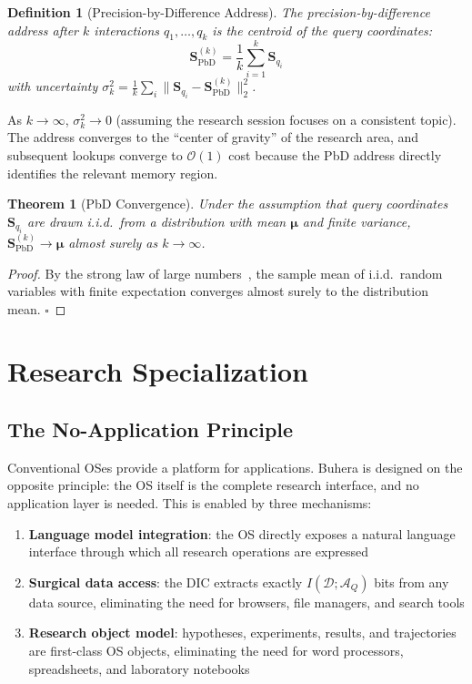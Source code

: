 \documentclass[12pt,twocolumn]{article}
\newtheorem{theorem}{Theorem}[section]
\newtheorem{definition}{Definition}[section]
\begin{document}
\begin{definition}[Precision-by-Difference Address]
The precision-by-difference address after $k$ interactions $q_1, \ldots, q_k$ is the centroid of the query coordinates:
\begin{equation}
\mathbf{S}_{\text{PbD}}^{(k)} = \frac{1}{k} \sum_{i=1}^k \mathbf{S}_{q_i}
\end{equation}
with uncertainty $\sigma_k^2 = \frac{1}{k} \sum_i \|\mathbf{S}_{q_i} - \mathbf{S}_{\text{PbD}}^{(k)}\|_2^2$.
\end{definition}

As $k \to \infty$, $\sigma_k^2 \to 0$ (assuming the research session focuses on a consistent topic). The address converges to the ``center of gravity'' of the research area, and subsequent lookups converge to $\mathcal{O}(1)$ cost because the PbD address directly identifies the relevant memory region.

\begin{theorem}[PbD Convergence]
Under the assumption that query coordinates $\mathbf{S}_{q_i}$ are drawn i.i.d.\ from a distribution with mean $\boldsymbol{\mu}$ and finite variance, $\mathbf{S}_{\text{PbD}}^{(k)} \to \boldsymbol{\mu}$ almost surely as $k \to \infty$.
\end{theorem}

\begin{proof}
By the strong law of large numbers~\cite{cover2006elements}, the sample mean of i.i.d.\ random variables with finite expectation converges almost surely to the distribution mean. $\square$
\end{proof}

\section{Research Specialization}
\label{sec:research}

\subsection{The No-Application Principle}

Conventional OSes provide a platform for applications. Buhera is designed on the opposite principle: the OS itself is the complete research interface, and no application layer is needed. This is enabled by three mechanisms:

\begin{enumerate}
\item \textbf{Language model integration}: the OS directly exposes a natural language interface through which all research operations are expressed
\item \textbf{Surgical data access}: the DIC extracts exactly $I(\mathcal{D}; \mathcal{A}_Q)$ bits from any data source, eliminating the need for browsers, file managers, and search tools
\item \textbf{Research object model}: hypotheses, experiments, results, and trajectories are first-class OS objects, eliminating the need for word processors, spreadsheets, and laboratory notebooks
\end{enumerate}
\end{document}
